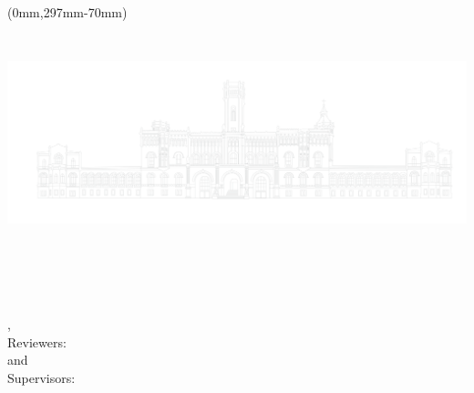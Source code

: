 \begin{titlepage}
  \begin{textblock*}{210mm}(0mm,297mm-70mm) %
    \includegraphics[width=210mm,height=70mm]{figures/castle.png}
  \end{textblock*}
\end{titlepage}


\hfill
\vfill
{
  \small
  \textbf{\thesisName} \\
  \textit{\thesisTitle} \\
  \thesisSubject, \thesisDate \\
  Reviewers: \thesisFirstReviewer\ \\
  and \thesisSecondReviewer \\
  Supervisors: \thesisFirstSupervisor\ %
  \textbf{\thesisUniversity} \\
  \textit{\thesisUniversityGroup} \\
  \thesisUniversityInstitute \\
  \thesisUniversityDepartment \\
  \thesisUniversityStreetAddress \\
  \thesisUniversityPostalCode\ \thesisUniversityCity
}
